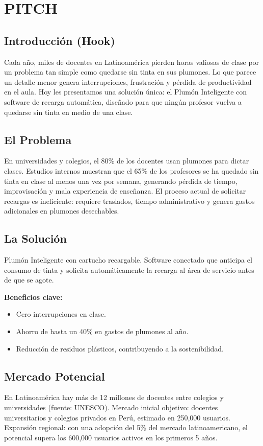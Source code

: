 \section{PITCH}

\subsection*{Introducción (Hook)}
Cada año, miles de docentes en Latinoamérica pierden horas valiosas de clase por un problema tan simple como quedarse sin tinta en sus plumones. Lo que parece un detalle menor genera interrupciones, frustración y pérdida de productividad en el aula. Hoy les presentamos una solución única: el Plumón Inteligente con software de recarga automática, diseñado para que ningún profesor vuelva a quedarse sin tinta en medio de una clase.

\subsection*{El Problema}
En universidades y colegios, el 80\% de los docentes usan plumones para dictar clases. Estudios internos muestran que el 65\% de los profesores se ha quedado sin tinta en clase al menos una vez por semana, generando pérdida de tiempo, improvisación y mala experiencia de enseñanza. El proceso actual de solicitar recargas es ineficiente: requiere traslados, tiempo administrativo y genera gastos adicionales en plumones desechables.

\subsection*{La Solución}
Plumón Inteligente con cartucho recargable. Software conectado que anticipa el consumo de tinta y solicita automáticamente la recarga al área de servicio antes de que se agote.

\textbf{Beneficios clave:}
\begin{itemize}
  \item Cero interrupciones en clase.
  \item Ahorro de hasta un 40\% en gastos de plumones al año.
  \item Reducción de residuos plásticos, contribuyendo a la sostenibilidad.
\end{itemize}

\subsection*{Mercado Potencial}
En Latinoamérica hay más de 12 millones de docentes entre colegios y universidades (fuente: UNESCO). Mercado inicial objetivo: docentes universitarios y colegios privados en Perú, estimado en 250,000 usuarios. Expansión regional: con una adopción del 5\% del mercado latinoamericano, el potencial supera los 600,000 usuarios activos en los primeros 5 años.

